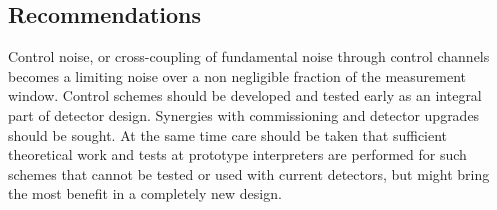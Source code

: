 \subsection{Recommendations}
Control noise, or cross-coupling of fundamental noise through control channels becomes a limiting noise over a non negligible fraction of the measurement window. Control schemes should be developed and tested early as an integral part of detector design. Synergies with commissioning and detector upgrades should be sought. At the same time care should be taken that sufficient theoretical work and tests at prototype interpreters are performed for such schemes that cannot be tested or used with current detectors, but might bring the most benefit in a completely new design.
